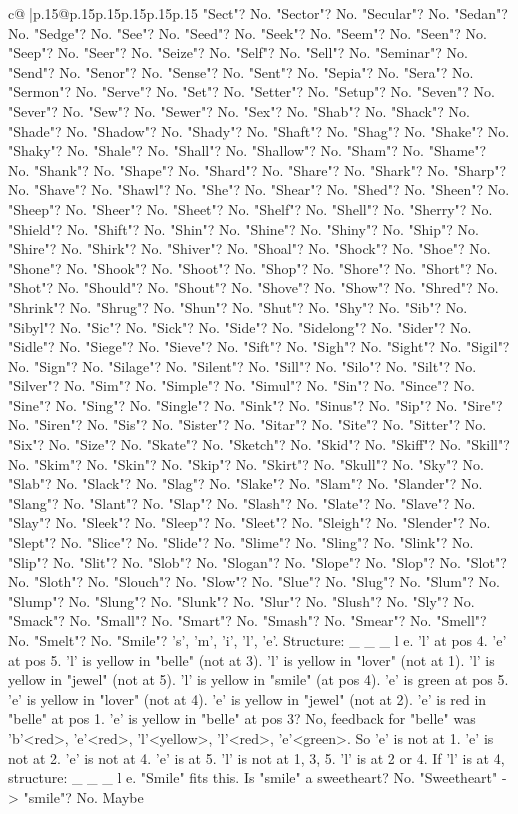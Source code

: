 \documentclass{article}
\begin{document}
{\begin{supertabular}{c@{$\;$}|p{.15\linewidth}@{}p{.15\linewidth}p{.15\linewidth}p{.15\linewidth}p{.15\linewidth}p{.15\linewidth}}
{{{"Sect"? No. "Sector"? No. "Secular"? No. "Sedan"? No. "Sedge"? No. "See"? No. "Seed"? No. "Seek"? No. "Seem"? No. "Seen"? No. "Seep"? No. "Seer"? No. "Seize"? No. "Self"? No. "Sell"? No. "Seminar"? No. "Send"? No. "Senor"? No. "Sense"? No. "Sent"? No. "Sepia"? No. "Sera"? No. "Sermon"? No. "Serve"? No. "Set"? No. "Setter"? No. "Setup"? No. "Seven"? No. "Sever"? No. "Sew"? No. "Sewer"? No. "Sex"? No. "Shab"? No. "Shack"? No. "Shade"? No. "Shadow"? No. "Shady"? No. "Shaft"? No. "Shag"? No. "Shake"? No. "Shaky"? No. "Shale"? No. "Shall"? No. "Shallow"? No. "Sham"? No. "Shame"? No. "Shank"? No. "Shape"? No. "Shard"? No. "Share"? No. "Shark"? No. "Sharp"? No. "Shave"? No. "Shawl"? No. "She"? No. "Shear"? No. "Shed"? No. "Sheen"? No. "Sheep"? No. "Sheer"? No. "Sheet"? No. "Shelf"? No. "Shell"? No. "Sherry"? No. "Shield"? No. "Shift"? No. "Shin"? No. "Shine"? No. "Shiny"? No. "Ship"? No. "Shire"? No. "Shirk"? No. "Shiver"? No. "Shoal"? No. "Shock"? No. "Shoe"? No. "Shone"? No. "Shook"? No. "Shoot"? No. "Shop"? No. "Shore"? No. "Short"? No. "Shot"? No. "Should"? No. "Shout"? No. "Shove"? No. "Show"? No. "Shred"? No. "Shrink"? No. "Shrug"? No. "Shun"? No. "Shut"? No. "Shy"? No. "Sib"? No. "Sibyl"? No. "Sic"? No. "Sick"? No. "Side"? No. "Sidelong"? No. "Sider"? No. "Sidle"? No. "Siege"? No. "Sieve"? No. "Sift"? No. "Sigh"? No. "Sight"? No. "Sigil"? No. "Sign"? No. "Silage"? No. "Silent"? No. "Sill"? No. "Silo"? No. "Silt"? No. "Silver"? No. "Sim"? No. "Simple"? No. "Simul"? No. "Sin"? No. "Since"? No. "Sine"? No. "Sing"? No. "Single"? No. "Sink"? No. "Sinus"? No. "Sip"? No. "Sire"? No. "Siren"? No. "Sis"? No. "Sister"? No. "Sitar"? No. "Site"? No. "Sitter"? No. "Six"? No. "Size"? No. "Skate"? No. "Sketch"? No. "Skid"? No. "Skiff"? No. "Skill"? No. "Skim"? No. "Skin"? No. "Skip"? No. "Skirt"? No. "Skull"? No. "Sky"? No. "Slab"? No. "Slack"? No. "Slag"? No. "Slake"? No. "Slam"? No. "Slander"? No. "Slang"? No. "Slant"? No. "Slap"? No. "Slash"? No. "Slate"? No. "Slave"? No. "Slay"? No. "Sleek"? No. "Sleep"? No. "Sleet"? No. "Sleigh"? No. "Slender"? No. "Slept"? No. "Slice"? No. "Slide"? No. "Slime"? No. "Sling"? No. "Slink"? No. "Slip"? No. "Slit"? No. "Slob"? No. "Slogan"? No. "Slope"? No. "Slop"? No. "Slot"? No. "Sloth"? No. "Slouch"? No. "Slow"? No. "Slue"? No. "Slug"? No. "Slum"? No. "Slump"? No. "Slung"? No. "Slunk"? No. "Slur"? No. "Slush"? No. "Sly"? No. "Smack"? No. "Small"? No. "Smart"? No. "Smash"? No. "Smear"? No. "Smell"? No. "Smelt"? No. "Smile"? 's', 'm', 'i', 'l', 'e'. Structure: \_ \_ \_ l e. 'l' at pos 4. 'e' at pos 5. 'l' is yellow in "belle" (not at 3). 'l' is yellow in "lover" (not at 1). 'l' is yellow in "jewel" (not at 5). 'l' is yellow in "smile" (at pos 4). 'e' is green at pos 5. 'e' is yellow in "lover" (not at 4). 'e' is yellow in "jewel" (not at 2). 'e' is red in "belle" at pos 1. 'e' is yellow in "belle" at pos 3? No, feedback for "belle" was 'b'<red>, 'e'<red>, 'l'<yellow>, 'l'<red>, 'e'<green>. So 'e' is not at 1. 'e' is not at 2. 'e' is not at 4. 'e' is at 5. 'l' is not at 1, 3, 5. 'l' is at 2 or 4. If 'l' is at 4, structure: \_ \_ \_ l e. "Smile" fits this. Is "smile" a sweetheart? No. "Sweetheart" {-}> "smile"? No. Maybe }}}
\end{supertabular}}
\end{document}
